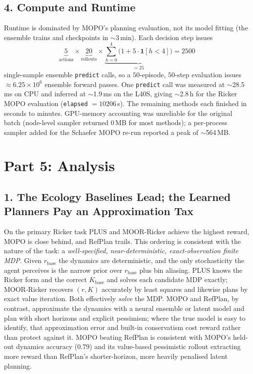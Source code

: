 \documentclass[11pt]{article}
\newcommand{\rbase}{r_{\mathrm{base}}}
\begin{document}
\subsection*{4. Compute and Runtime}
Runtime is dominated by MOPO's planning evaluation, not its model fitting (the
ensemble trains and checkpoints in $\sim$3\,min). Each decision step issues
\[
    \underbrace{5}_{\text{actions}} \times \underbrace{20}_{\text{rollouts}}
    \times \underbrace{\textstyle\sum_{h=0}^{4}\big(1 + 5\cdot\mathbf{1}[h<4]\big)}_{=25}
    = 2500
\]
single-sample ensemble \texttt{predict} calls, so a $50$-episode, $50$-step
evaluation issues $\approx 6.25 \times 10^{6}$ ensemble forward passes. One
\texttt{predict} call was measured at $\sim$28.5\,ms on CPU and inferred at
$\sim$1.9\,ms on the L40S, giving $\sim$2.8\,h for the Ricker MOPO evaluation
(\texttt{elapsed} $=10206$\,s). The remaining methods each finished in seconds to
minutes. GPU-memory accounting was unreliable for the original batch (node-level
sampler returned $0$\,MB for most methods); a per-process sampler added for the
Schaefer MOPO re-run reported a peak of $\sim$564\,MB.

\newpage

\section*{Part 5: Analysis}
\subsection*{1. The Ecology Baselines Lead; the Learned Planners Pay an Approximation Tax}
On the primary Ricker task PLUS and MOOR-Ricker achieve the highest reward, MOPO
is close behind, and RefPlan trails. This ordering is consistent with the nature
of the task: a \emph{well-specified, near-deterministic, exact-observation finite
MDP}. Given $\rbase$ the dynamics are deterministic, and the only stochasticity
the agent perceives is the narrow prior over $\rbase$ plus bin aliasing. PLUS
knows the Ricker form and the correct $K_{\mathrm{base}}$ and solves each candidate
MDP exactly; MOOR-Ricker recovers $(r, K)$ accurately by least squares and likewise
plans by exact value iteration. Both effectively \emph{solve} the MDP. MOPO and
RefPlan, by contrast, approximate the dynamics with a neural ensemble or latent
model and plan with short horizons and explicit pessimism; where the true model is
easy to identify, that approximation error and built-in conservatism cost reward
rather than protect against it. MOPO beating RefPlan is consistent with MOPO's
held-out dynamics accuracy ($0.79$) and its value-based pessimistic rollout
extracting more reward than RefPlan's shorter-horizon, more heavily penalised
latent planning.
\end{document}
